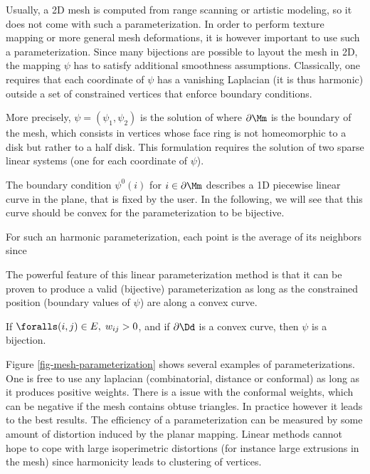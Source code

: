 Usually, a 2D mesh is computed from range scanning or artistic modeling, so it does not come with such a parameterization. In order to perform texture mapping or more general mesh deformations, it is however important to use such a parameterization. Since many bijections are possible to layout the mesh in 2D, the mapping $\psi$ has to satisfy additional smoothness assumptions. Classically, one requires that each coordinate of $\psi$ has a vanishing Laplacian (it is thus harmonic) outside a set of constrained vertices that enforce boundary conditions. 

More precisely, $\psi=(\psi_1,\psi_2)$ is the solution of 
where $\partial \Mm$ is the boundary of the mesh, which consists in vertices whose face ring is not homeomorphic to a disk but rather to a half disk. This formulation requires the solution of two sparse linear systems (one for each coordinate of $\psi$).

The boundary condition $\psi^0(i)$ for $i \in \partial \Mm$ describes a 1D piecewise linear curve in the plane, that is fixed by the user. In the following, we will see that this curve should be convex for the parameterization to be bijective.


\begin{rem} For such an harmonic parameterization, each point is the average of its neighbors since
\end{rem}

The powerful feature of this linear parameterization method is that it can be proven to produce a valid (bijective) parameterization as long as the constrained position (boundary values of $\psi$) are along a convex curve.

\begin{thm} 
	If $\foralls (i,j) \in E, \; w_{ij} > 0$, and if $\partial \Dd$ is a convex curve, then $\psi$ is a bijection.
\end{thm}

Figure \ref{fig-mesh-parameterization} shows several examples of parameterizations. One is free to use any laplacian (combinatorial, distance or conformal) as long as it produces positive weights. There is a issue with the conformal weights, which can be negative if the mesh contains obtuse triangles. In practice however it leads to the best results. The efficiency of a parameterization can be measured by some amount of distortion induced by the planar mapping. Linear methods cannot hope to cope with large isoperimetric distortions (for instance large extrusions in the mesh) since harmonicity leads to clustering of vertices.

